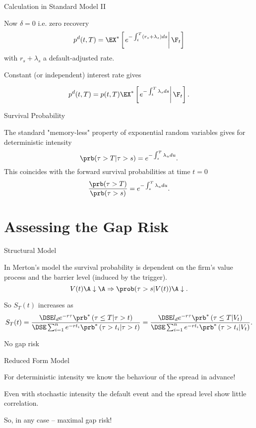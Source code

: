 {Calculation in Standard Model II}

Now $\delta=0$ i.e. zero recovery
$$
p^d (t,T) =  \EX^* \left[ \left.e^{-\int_t^T (r_s+ \lambda_s) ds} \right| \F_t\right]
$$
with $r_s+\lambda_s$ a default-adjusted rate.

Constant (or independent) interest rate gives

$$
p^d (t,T) =  p(t,T) \EX^* \left[ \left.e^{-\int_t^T \lambda_s ds} \right| \F_t\right].
$$

{Survival Probability}

The standard "memory-less" property of exponential random variables gives for deterministic intensity
$$
\prb(\tau > T | \tau >s) =   e^{-\int_s^T \lambda_udu}.
$$
This coincides with the forward survival probabilities at time $t=0$
$$
\frac{\prb(\tau > T)}{\prb(\tau>s)}=  e^{-\int_s^T \lambda_udu}.
$$

\section{Assessing the Gap Risk}

{Structural Model}






	In Merton's model the survival probability is dependent on the firm's value process and the barrier level (induced by the trigger).
$$
V(t) \A \downarrow \A \Rightarrow \prob(\tau > s |V(t)) \A \downarrow.
$$

	So $S_T(t)$ increases as
$$
S_T(t)=\frac{\DSE l_d e^{-r\tau} \prb^*\left(\tau\leq T  | \tau >t\right)} {\DSE\sum_{i=1}^n e^{-rt_i} \prb^*\left(\tau >t_i| \tau >t\right)}
=\frac{\DSE l_d e^{-r\tau} \prb^*\left(\tau\leq T  | V_t \right)} {\DSE\sum_{i=1}^n e^{-rt_i} \prb^*\left(\tau >t_i| V_t\right)}.
$$

	No gap risk






{Reduced Form Model}






For deterministic intensity we know the behaviour of the spread  in advance!

Even with stochastic intensity the default event and the spread level show little correlation.

	So, in any case  -- maximal gap risk!





